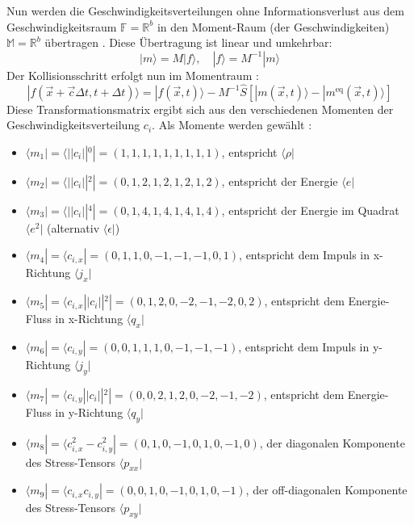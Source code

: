 \documentclass[a4paper,10pt]{scrreprt}
\begin{document}
Nun werden die Geschwindigkeitsverteilungen ohne Informationsverlust aus dem Geschwindigkeitsraum $ \mathbb{F} = \mathbb{R}^b $ in den Moment-Raum (der Geschwindigkeiten) $ \mathbb{M} = \mathbb{R}^b $  übertragen \cite{2002,Lallemand2000,Lallemand2003}. Diese Übertragung ist linear und umkehrbar:
\begin{equation}
 |m\rangle = M | f \rangle, \quad |f\rangle = M^{-1} | m \rangle
\end{equation}
Der Kollisionsschritt erfolgt nun im Momentraum \cite{2002,Lallemand2003}:
\begin{equation}
 | f(\vec{x} + \vec{c} \Delta t, t + \Delta t) \rangle = | f(\vec{x},t) \rangle - M^{-1} \hat{S} [ | m(\vec{x},t) \rangle - | m^{\text{eq}}(\vec{x},t) \rangle]
\end{equation}
Diese Transformationsmatrix ergibt sich aus den verschiedenen Momenten der Geschwindigkeitsverteilung $c_i$. Als Momente werden gewählt \cite{Bouzidi2001}:
\begin{itemize}
 \item $ \langle m_1 | =  \langle ||c_i||^0 | = (1,1,1,1,1,1,1,1,1)$, entspricht $\langle \rho |$ 
 \item $ \langle m_2 | =  \langle ||c_i||^2 | = (0,1,2,1,2,1,2,1,2)$, entspricht der Energie $\langle e|$
 \item $ \langle m_3 | =  \langle ||c_i||^4 | = (0,1,4,1,4,1,4,1,4)$, entspricht der Energie im Quadrat $\langle e^2|$ (alternativ $\langle \epsilon|$)
 \item $ \langle m_4 | =  \langle c_{i,x} | = (0,1,1,0,-1,-1,-1,0,1)$, entspricht dem Impuls in x-Richtung $\langle j_x|$
 \item $ \langle m_5 | =  \langle c_{i,x} ||c_i||^2 | = (0,1,2,0,-2,-1,-2,0,2)$, entspricht dem Energie-Fluss in x-Richtung $\langle q_x |$
 \item $ \langle m_6 | =  \langle c_{i,y} | = (0,0,1,1,1,0,-1,-1,-1)$, entspricht dem Impuls in y-Richtung $\langle j_y|$
 \item $ \langle m_7 | =  \langle c_{i,y} ||c_i||^2 | = (0,0,2,1,2,0,-2,-1,-2)$, entspricht dem Energie-Fluss in y-Richtung $\langle q_y |$
 \item $ \langle m_8 | =  \langle c^2_{i,x} - c^2_{i,y}  | = (0,1,0,-1,0,1,0,-1,0)$, der diagonalen Komponente des Stress-Tensors $\langle p_{xx} |$
 \item $ \langle m_9 | =  \langle c_{i,x} c_{i,y}  | = (0,0,1,0,-1,0,1,0,-1)$, der off-diagonalen Komponente des Stress-Tensors $\langle p_{xy} |$
\end{itemize}
\end{document}
